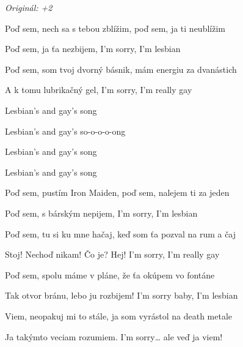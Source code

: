 \begin{song}


\begin{headerbox}
 \quad
\textit{Originál: +2}
\end{headerbox}

\begin{hchordbox}
\end{hchordbox}

\Large

\bigskip

 Poď sem, nech sa s tebou zblížim,  poď sem, ja ti neublížim \par
{} Poď sem, ja ťa nezbijem,  I'm sorry, I'm lesbian \par
{} Poď sem, som tvoj dvorný básnik,  mám energiu za dvanástich \par
{} A k tomu lubrikačný gel,  I'm sorry, I'm really gay \par

\bigskip

\begin{chorusbox}{\Refren}
Lesbian's and gay's song \par
{}Lesbian's and gay's so-o-o-o-ong \par
{}Lesbian's and gay's song \par
{}Lesbian's and gay's song \par
\end{chorusbox}

\bigskip

 Poď sem, pustím Iron Maiden,  poď sem, nalejem ti za jeden \par
{} Poď sem, s bárským nepijem,  I'm sorry, I'm lesbian \par
{} Poď sem, tu si ku mne hačaj,  keď som ťa pozval na rum a čaj \par
{} Stoj! Nechoď nikam! Čo je? Hej!  I'm sorry, I'm really gay \par

\bigskip

\Refren

\bigskip

 Poď sem, spolu máme v pláne,  že ťa okúpem vo fontáne \par
{} Tak otvor bránu, lebo ju rozbijem!  I'm sorry baby, I'm lesbian \par
{} Viem, neopakuj mi to stále,  ja som vyrástol na death metale \par
{} Ja takýmto veciam rozumiem.  I'm sorry… ale veď ja viem! \par

\bigskip

\Refren {}

\end{song}